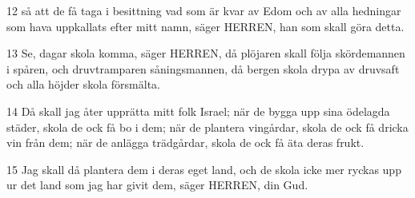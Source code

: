 \par 12 så att de få taga i besittning vad som är kvar av Edom och av alla hedningar som hava uppkallats efter mitt namn, säger HERREN, han som skall göra detta.
\par 13 Se, dagar skola komma, säger HERREN, då plöjaren skall följa skördemannen i spåren, och druvtramparen såningsmannen, då bergen skola drypa av druvsaft och alla höjder skola försmälta.
\par 14 Då skall jag åter upprätta mitt folk Israel; när de bygga upp sina ödelagda städer, skola de ock få bo i dem; när de plantera vingårdar, skola de ock få dricka vin från dem; när de anlägga trädgårdar, skola de ock få äta deras frukt.
\par 15 Jag skall då plantera dem i deras eget land, och de skola icke mer ryckas upp ur det land som jag har givit dem, säger HERREN, din Gud.



